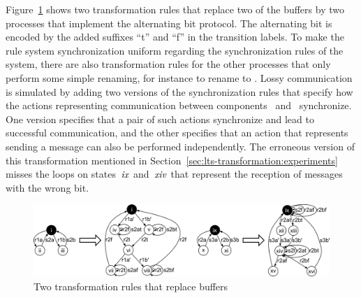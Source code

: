 Figure~\ref{fig:prop-pres-case-studies:abp-rules} shows two transformation rules that replace two of the buffers by two processes that implement the alternating bit protocol.
The alternating bit is encoded by the added suffixes ``t'' and ``f'' in the transition labels.
To make the rule system synchronization uniform regarding the synchronization rules of the system, there are also transformation rules for the other processes that only perform some simple renaming, for instance to rename  to .
Lossy communication is simulated by adding two versions of the synchronization rules that specify how the actions representing communication between components~ and~ synchronize.
One version specifies that a pair of such actions synchronize and lead to successful communication, and the other specifies that an action that represents sending a message can also be performed independently.
The erroneous version of this transformation mentioned in Section~\ref{sec:lts-transformation:experiments} misses the loops on states~$\it{ix}$ and~$\it{xiv}$ that represent the reception of messages with the wrong bit.

\begin{figure}[hbt]
\centering
\includegraphics[width=1.0\linewidth]{prop-pres-case-studies/figs/abp-rules}
\caption{Two transformation rules that replace buffers}
\label{fig:prop-pres-case-studies:abp-rules}
\end{figure}


